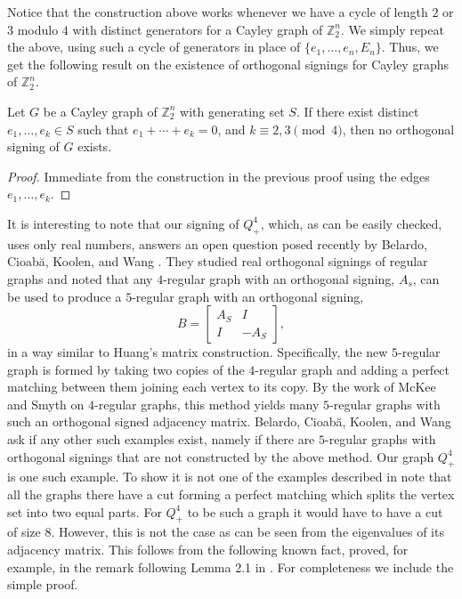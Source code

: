 Notice that the construction above works whenever we have a 
cycle of length $2$ or $3$ modulo $4$ with distinct generators for a Cayley 
graph of $\mathbb{Z}_2^n$. We simply repeat the above, using such a
cycle of generators in place of $\{e_1, \ldots, e_n, E_n\}$. Thus, we get the following result on the existence of orthogonal signings 
for Cayley graphs of $\mathbb{Z}_2^n$.
\begin{prop}
Let $G$ be a Cayley graph of $\mathbb{Z}_2^n$ with generating 
set $S$. If there exist distinct $e_1, \ldots, e_k \in S$ 
such that $e_1 + \cdots + e_k = 0$, and 
$k \equiv 2,3 \pmod{4}$, then no orthogonal signing of $G$ exists.
\end{prop}
\begin{proof}
Immediate from the construction in the previous 
proof using the edges $e_1, \ldots, e_k$.
\end{proof}
It is interesting to note that our signing of $Q_+^4$, which, as can
be easily checked,
uses only real numbers, 
answers an open question posed recently by Belardo, Cioab\u{a}, 
Koolen, and Wang \cite{BCKW}. They studied real orthogonal signings of 
regular graphs and noted that any $4$-regular graph with an orthogonal 
signing, $A_s$, can be used to produce a $5$-regular 
graph with an orthogonal signing,
\[
B=
\left[
\begin{array}{cc}
A_{S} & I \\
I & -A_{S}
\end{array}
\right],
\] 
in a way similar to Huang's matrix construction. Specifically, 
the new $5$-regular graph is formed by taking two copies of the 
$4$-regular graph and adding a perfect matching between them joining
each vertex to its copy. By the work of McKee and Smyth 
\cite{MS} on $4$-regular graphs, this method yields many 
$5$-regular graphs with such an orthogonal signed adjacency matrix. 
Belardo, Cioab\u{a}, Koolen, and Wang ask if any other such examples exist, 
namely if there are $5$-regular graphs with orthogonal signings that
are not constructed by the above method. 
Our graph $Q_+^4$ is one such example. To show it is not one
of the examples described in \cite{BCKW} note
that all the graphs there have a cut forming  a perfect matching which
splits the vertex set into two equal parts. For $Q_+^4$ to be such a 
graph it would have to have a cut of size $8$. However, this is not the 
case as can be seen from the eigenvalues of its adjacency matrix. 
This follows from the following known fact, proved, for example, 
in the remark following Lemma 2.1 in \cite{AM}. 
For completeness we include the simple proof.

